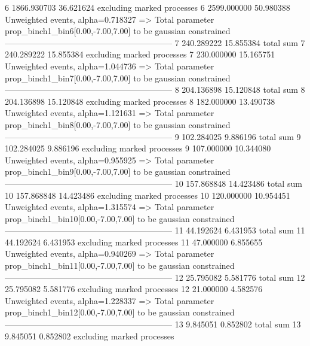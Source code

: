 6          1866.930703     36.621624       excluding marked processes    
6          2599.000000     50.980388       Unweighted events, alpha=0.718327
  => Total parameter prop_binch1_bin6[0.00,-7.00,7.00] to be gaussian constrained
------------------------------------------------------------
7          240.289222      15.855384       total sum                     
7          240.289222      15.855384       excluding marked processes    
7          230.000000      15.165751       Unweighted events, alpha=1.044736
  => Total parameter prop_binch1_bin7[0.00,-7.00,7.00] to be gaussian constrained
------------------------------------------------------------
8          204.136898      15.120848       total sum                     
8          204.136898      15.120848       excluding marked processes    
8          182.000000      13.490738       Unweighted events, alpha=1.121631
  => Total parameter prop_binch1_bin8[0.00,-7.00,7.00] to be gaussian constrained
------------------------------------------------------------
9          102.284025      9.886196        total sum                     
9          102.284025      9.886196        excluding marked processes    
9          107.000000      10.344080       Unweighted events, alpha=0.955925
  => Total parameter prop_binch1_bin9[0.00,-7.00,7.00] to be gaussian constrained
------------------------------------------------------------
10         157.868848      14.423486       total sum                     
10         157.868848      14.423486       excluding marked processes    
10         120.000000      10.954451       Unweighted events, alpha=1.315574
  => Total parameter prop_binch1_bin10[0.00,-7.00,7.00] to be gaussian constrained
------------------------------------------------------------
11         44.192624       6.431953        total sum                     
11         44.192624       6.431953        excluding marked processes    
11         47.000000       6.855655        Unweighted events, alpha=0.940269
  => Total parameter prop_binch1_bin11[0.00,-7.00,7.00] to be gaussian constrained
------------------------------------------------------------
12         25.795082       5.581776        total sum                     
12         25.795082       5.581776        excluding marked processes    
12         21.000000       4.582576        Unweighted events, alpha=1.228337
  => Total parameter prop_binch1_bin12[0.00,-7.00,7.00] to be gaussian constrained
------------------------------------------------------------
13         9.845051        0.852802        total sum                     
13         9.845051        0.852802        excluding marked processes    
